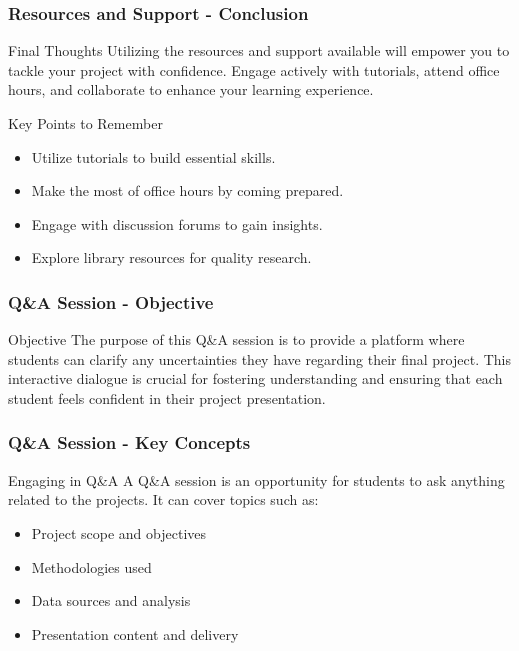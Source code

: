 \documentclass[aspectratio=169]{beamer}
\begin{document}
\begin{frame}[fragile]
    \frametitle{Resources and Support - Conclusion}
    \begin{block}{Final Thoughts}
        Utilizing the resources and support available will empower you to tackle your project with confidence. 
        Engage actively with tutorials, attend office hours, and collaborate to enhance your learning experience.
    \end{block}
    \begin{block}{Key Points to Remember}
        \begin{itemize}
            \item Utilize tutorials to build essential skills.
            \item Make the most of office hours by coming prepared.
            \item Engage with discussion forums to gain insights.
            \item Explore library resources for quality research.
        \end{itemize}
    \end{block}
\end{frame}

\begin{frame}[fragile]
    \frametitle{Q\&A Session - Objective}
    \begin{block}{Objective}
        The purpose of this Q\&A session is to provide a platform where students can clarify any uncertainties they have regarding their final project. 
        This interactive dialogue is crucial for fostering understanding and ensuring that each student feels confident in their project presentation.
    \end{block}
\end{frame}

\begin{frame}[fragile]
    \frametitle{Q\&A Session - Key Concepts}
    \begin{block}{Engaging in Q\&A}
        A Q\&A session is an opportunity for students to ask anything related to the projects. It can cover topics such as:
    \end{block}
    \begin{itemize}
        \item Project scope and objectives
        \item Methodologies used
        \item Data sources and analysis
        \item Presentation content and delivery
    \end{itemize}
\end{frame}
\end{document}
